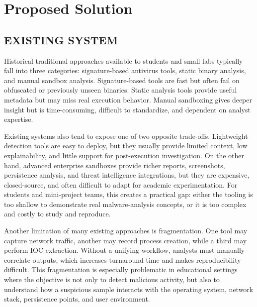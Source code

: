 \documentclass[a4paper,12pt,oneside]{report}
\begin{document}
\section{Proposed Solution}
\subsection{EXISTING SYSTEM}
Historical traditional approaches available to students and small labs typically fall into three categories: signature-based antivirus tools, static binary analysis, and manual sandbox analysis. Signature-based tools are fast but often fail on obfuscated or previously unseen binaries. Static analysis tools provide useful metadata but may miss real execution behavior. Manual sandboxing gives deeper insight but is time-consuming, difficult to standardize, and dependent on analyst expertise.

\par

\par

Existing systems also tend to expose one of two opposite trade-offs. Lightweight detection tools are easy to deploy, but they usually provide limited context, low explainability, and little support for post-execution investigation. On the other hand, advanced enterprise sandboxes provide richer reports, screenshots, persistence analysis, and threat intelligence integrations, but they are expensive, closed-source, and often difficult to adapt for academic experimentation. For students and mini-project teams, this creates a practical gap: either the tooling is too shallow to demonstrate real malware-analysis concepts, or it is too complex and costly to study and reproduce.

\par

\par

Another limitation of many existing approaches is fragmentation. One tool may capture network traffic, another may record process creation, while a third may perform IOC extraction. Without a unifying workflow, analysts must manually correlate outputs, which increases turnaround time and makes reproducibility difficult. This fragmentation is especially problematic in educational settings where the objective is not only to detect malicious activity, but also to understand how a suspicious sample interacts with the operating system, network stack, persistence points, and user environment.
\end{document}
